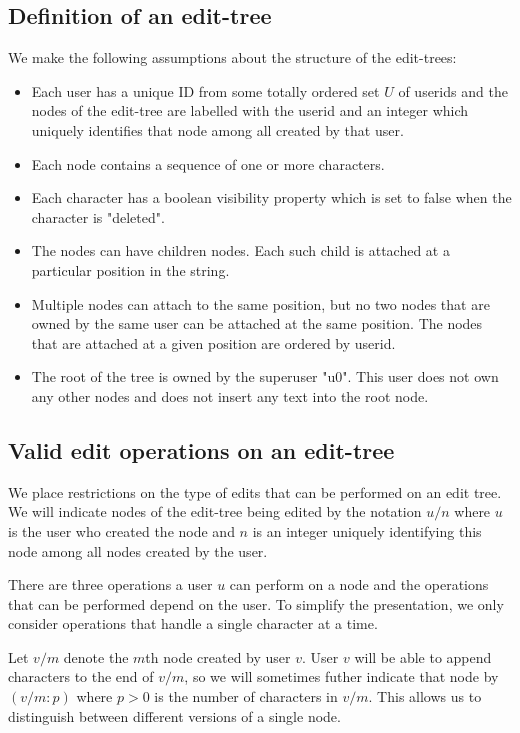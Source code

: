 \documentclass{amsart}
\begin{document}
\subsection{Definition of an edit-tree}
We make the following assumptions about the structure of the edit-trees:
\begin{itemize}
\item Each user has a unique ID from some totally ordered set $U$ of userids 
and the nodes of the edit-tree 
are labelled with the userid and an integer which uniquely identifies
that node among all created by that user.
\item Each node contains a sequence of one or more characters.
\item Each character has a boolean visibility property which is set
to false when the character is "deleted". 
\item The nodes can have children nodes.
Each such child is attached at a particular position in the string.
\item Multiple nodes can attach to the same position, but no two nodes that are owned by the 
same user can be attached at the same position. The nodes that are attached at
a given position are ordered by userid. 
\item The root of the tree is owned by the
superuser "u0". This user does not own any other nodes and does not insert any
text into the root node. 
\end{itemize}

\subsection{Valid edit operations on an edit-tree}
We place restrictions on the type of edits that can be performed
on an edit tree.  We will indicate nodes 
of the edit-tree being edited by
the notation $u/n$ where $u$ is the user who created the node and $n$ is an
integer uniquely identifying this node among all nodes created by the user.

There are three operations a user $u$ can perform on a node and the operations
that can be performed depend on the user. To simplify the presentation, we only consider operations that handle a single character at a time.

Let $v/m$ denote the $m$th node created by user $v$.
User $v$ will be able to append characters to the end of $v/m$, so 
we will sometimes futher indicate that node by $(v/m:p)$
where $p>0$ is the number of characters in $v/m$. This allows us to
distinguish between different versions of a single node.
\end{document}

